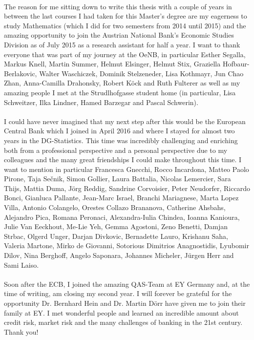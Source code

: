 \\
The reason for me sitting down to write this thesis with a couple of years in between the last courses I had taken for this Master's degree are my eagerness to study Mathematics (which I did for two semesters from 2014 until 2015) and the amazing opportunity to join the Austrian National Bank's Economic Studies Division as of July 2015 as a research assistant for half a year. I want to thank everyone that was part of my journey at the OeNB, in particular Esther Segalla, Markus Knell, Martin Summer, Helmut Elsinger, Helmut Stix, Graziella Hofbaur-Berlakovic, Walter Waschiczek, Dominik Stelzeneder, Lisa Kothmayr, Jun Chao Zhan, Anna-Camilla Drahonsky, Robert Köck and Ruth Fulterer as well as my amazing people I met at the Strudlhofgasse student home (in particular, Lisa Schweitzer, Ilka Lindner, Hamed Barzegar and Pascal Schwerin).  \\
\\
I could have never imagined that my next step after this would be the European Central Bank which I joined in April 2016 and where I stayed for almost two years in the DG-Statistics. This time was incredibly challenging and enriching both from a professional perspective and a personal perspective due to my colleagues and the many great friendships I could make throughout this time. I want to mention in particular Francesca Gnecchi, Rocco Incardona, Matteo Paolo Pirone, Taja Sečnik, Simon Gollier, Laura Battalia, Nicolas Lemercier, Sara Thijs, Mattia Duma, Jörg Reddig, Sandrine Corvoisier, Peter Neudorfer, Riccardo Bonci, Gianluca Pallante, Jean-Marc Israel, Branchi Mariagnese, Marta Lopez Villa, Antonio Colangelo, Orestes Collazo Brananova, Catherine Ahsbahs, Alejandro Pica, Romana Peronaci, Alexandra-Iulia Chindea, Ioanna Kanioura, Julie Van Eeckhout, Me-Lie Yeh, Gemma Agostoni, Zeno Benetti, Damjan Strbac, Olgerd Unger, Darjan Divkovic, Bernadette Lauro, Krishanu Saha, Valeria Martone, Mirko de Giovanni, Sotorious Dimitrios Anagnostidis, Lyubomir Dilov, Nina Berghoff, Angelo Saponara, Johannes Micheler, Jürgen Herr and Sami Laiso.\\
\\
Soon after the ECB, I joined the amazing QAS-Team at EY Germany and, at the time of writing, am closing my second year. I will forever be grateful for the opportunity Dr. Bernhard Hein and Dr. Martin Dörr have given me to join their family at EY. I met wonderful people and learned an incredible amount about credit risk, market risk and the many challenges of banking in the 21st century. Thank you!